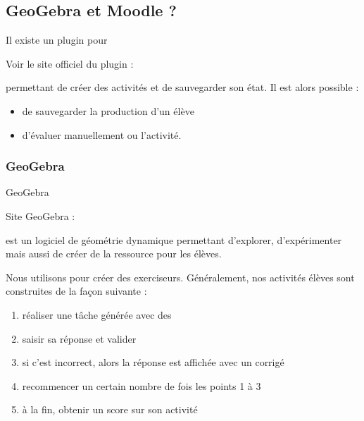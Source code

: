 \documentclass[letterpaper,10pt,french]{sphinxmanual}
\begin{document}
\subsection{GeoGebra et Moodle ?}
\label{\detokenize{projet-description::doc}}\label{\detokenize{projet-description:geogebra-et-moodle}}
Il existe un plugin pour  %
\begin{footnote}[1]\sphinxAtStartFootnote
Voir le site officiel du plugin : 
%
\end{footnote} permettant de créer des activités  et de sauvegarder son état. Il est alors possible :
\begin{itemize}
\item {} 
de sauvegarder la production d’un élève

\item {} 
d’évaluer manuellement ou  l’activité.

\end{itemize}


\subsubsection{GeoGebra}
\label{\detokenize{projet-description:geogebra}}
GeoGebra %
\begin{footnote}[2]\sphinxAtStartFootnote
Site GeoGebra : 
%
\end{footnote} est un logiciel de géométrie dynamique permettant d’explorer, d’expérimenter mais aussi de créer de la ressource pour les élèves.

Nous utilisons  pour créer des exerciseurs. Généralement, nos activités élèves sont construites de la façon suivante :
\begin{enumerate}
\item {} 
réaliser une tâche générée avec des 

\item {} 
saisir sa réponse et valider

\item {} 
si c’est incorrect, alors la réponse est affichée avec un corrigé

\item {} 
recommencer un certain nombre de fois les points 1 à 3

\item {} 
à la fin, obtenir un score sur son activité

\end{enumerate}
\end{document}
